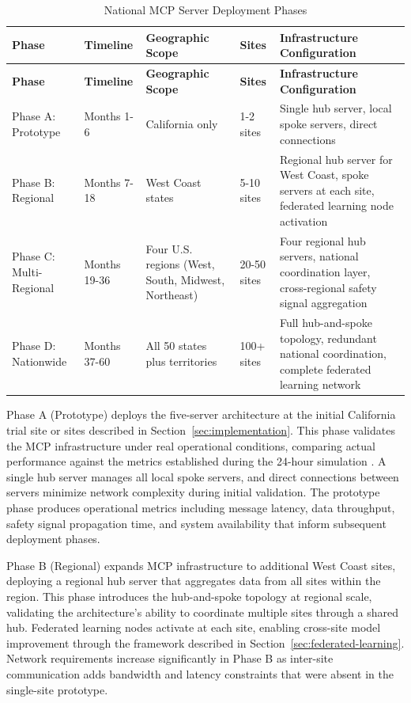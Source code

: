 \begin{longtable}{l p{2.2cm} p{2.5cm} p{2.2cm} p{4.0cm}}
\caption{National MCP Server Deployment Phases}
\label{tab:mcp-deployment-phases} \\
\toprule
\textbf{Phase} & \textbf{Timeline} & \textbf{Geographic Scope} & \textbf{Sites} & \textbf{Infrastructure Configuration} \\
\midrule
\endfirsthead
\toprule
\textbf{Phase} & \textbf{Timeline} & \textbf{Geographic Scope} & \textbf{Sites} & \textbf{Infrastructure Configuration} \\
\midrule
\endhead
\bottomrule
\endfoot
\bottomrule
\endlastfoot
Phase A: Prototype & Months 1-6 & California only & 1-2 sites & Single hub server, local spoke servers, direct connections \\
\midrule
Phase B: Regional & Months 7-18 & West Coast states & 5-10 sites & Regional hub server for West Coast, spoke servers at each site, federated learning node activation \\
\midrule
Phase C: Multi-Regional & Months 19-36 & Four U.S. regions (West, South, Midwest, Northeast) & 20-50 sites & Four regional hub servers, national coordination layer, cross-regional safety signal aggregation \\
\midrule
Phase D: Nationwide & Months 37-60 & All 50 states plus territories & 100+ sites & Full hub-and-spoke topology, redundant national coordination, complete federated learning network \\
\end{longtable}

Phase A (Prototype) deploys the five-server architecture at the initial
California trial site or sites described in
Section~\ref{sec:implementation}. This phase validates the MCP infrastructure
under real operational conditions, comparing actual performance against the
metrics established during the 24-hour simulation \cite{site-docs}. A single
hub server manages all local spoke servers, and direct connections between
servers minimize network complexity during initial validation. The prototype
phase produces operational metrics including message latency, data throughput,
safety signal propagation time, and system availability that inform subsequent
deployment phases.

Phase B (Regional) expands MCP infrastructure to additional West Coast sites,
deploying a regional hub server that aggregates data from all sites within the
region. This phase introduces the hub-and-spoke topology at regional scale,
validating the architecture's ability to coordinate multiple sites through a
shared hub. Federated learning nodes activate at each site, enabling cross-site
model improvement through the framework described in
Section~\ref{sec:federated-learning}. Network requirements increase
significantly in Phase B as inter-site communication adds bandwidth and latency
constraints that were absent in the single-site prototype.

